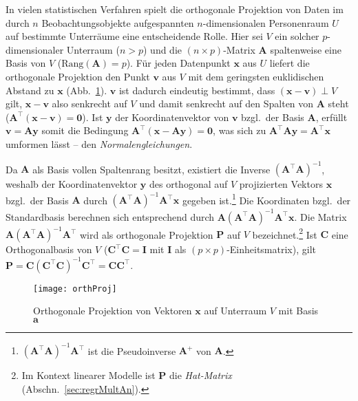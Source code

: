 In vielen statistischen Verfahren spielt die orthogonale Projektion von Daten im durch $n$ Beobachtungsobjekte aufgespannten $n$-dimensionalen Personenraum $U$ auf bestimmte Unterräume eine entscheidende Rolle. Hier sei $V$ ein solcher $p$-dimensionaler Unterraum ($n > p$) und die $(n \times p)$-Matrix $\bm{A}$ spaltenweise eine Basis von $V$ ($\text{Rang}(\bm{A}) = p$). Für jeden Datenpunkt $\bm{x}$ aus $U$ liefert die orthogonale Projektion den Punkt $\bm{v}$ aus $V$ mit dem geringsten euklidischen Abstand zu $\bm{x}$ (Abb.\ \ref{fig:orthProj}). $\bm{v}$ ist dadurch eindeutig bestimmt, dass $(\bm{x} - \bm{v}) \perp V$ gilt, $\bm{x} - \bm{v}$ also senkrecht auf $V$ und damit senkrecht auf den Spalten von $\bm{A}$ steht ($\bm{A}^{\top} (\bm{x} - \bm{v}) = \bm{0}$). Ist $\bm{y}$ der Koordinatenvektor von $\bm{v}$ bzgl.\ der Basis $\bm{A}$, erfüllt $\bm{v} = \bm{A} \bm{y}$ somit die Bedingung $\bm{A}^{\top} (\bm{x} - \bm{A} \bm{y}) = \bm{0}$, was sich zu $\bm{A}^{\top} \bm{A} \bm{y} = \bm{A}^{\top} \bm{x}$ umformen lässt -- den \emph{Normalengleichungen}.

Da $\bm{A}$ als Basis vollen Spaltenrang besitzt, existiert die Inverse $(\bm{A}^{\top} \bm{A})^{-1}$, weshalb der Koordinatenvektor $\bm{y}$ des orthogonal auf $V$ projizierten Vektors $\bm{x}$ bzgl.\ der Basis $\bm{A}$ durch $(\bm{A}^{\top} \bm{A})^{-1} \bm{A}^{\top} \bm{x}$ gegeben ist.\footnote{$(\bm{A}^{\top} \bm{A})^{-1} \bm{A}^{\top}$ ist die Pseudoinverse $\bm{A}^{+}$ von $\bm{A}$.} Die Koordinaten bzgl.\ der Standardbasis berechnen sich entsprechend durch $\bm{A} (\bm{A}^{\top} \bm{A})^{-1} \bm{A}^{\top} \bm{x}$. Die Matrix $\bm{A} (\bm{A}^{\top} \bm{A})^{-1} \bm{A}^{\top}$ wird als orthogonale Projektion $\bm{P}$ auf $V$ bezeichnet.\footnote{Im Kontext linearer Modelle ist $\bm{P}$ die \emph{Hat-Matrix} (Abschn.\ \ref{sec:regrMultAn}).} Ist $\bm{C}$ eine Orthogonalbasis von $V$ ($\bm{C}^{\top} \bm{C} = \bm{I}$ mit $\bm{I}$ als $(p \times p)$-Einheitsmatrix), gilt $\bm{P} = \bm{C} (\bm{C}^{\top} \bm{C})^{-1} \bm{C}^{\top} = \bm{C} \bm{C}^{\top}$.

\begin{figure}[ht]
\centering
\texttt{[image: orthProj]}
\vspace*{-1em}
\caption{Orthogonale Projektion von Vektoren $\bm{x}$ auf Unterraum $V$ mit Basis $\bm{a}$}
\label{fig:orthProj}
\end{figure}

